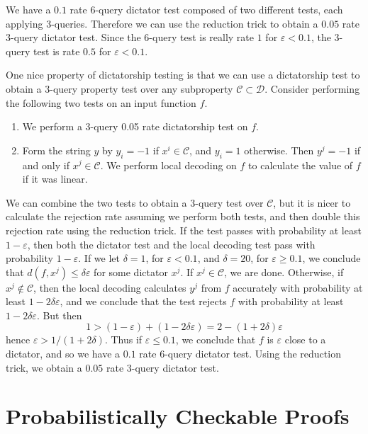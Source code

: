 \begin{example}
    We have a $0.1$ rate 6-query dictator test composed of two different tests, each applying 3-queries. Therefore we can use the reduction trick to obtain a $0.05$ rate 3-query dictator test. Since the 6-query test is really rate $1$ for $\varepsilon < 0.1$, the 3-query test is rate $0.5$ for $\varepsilon < 0.1$.
\end{example}

One nice property of dictatorship testing is that we can use a dictatorship test to obtain a 3-query property test over any subproperty $\mathcal{C} \subset \mathcal{D}$. Consider performing the following two tests on an input function $f$.
%
\begin{enumerate}
    \item We perform a 3-query 0.05 rate dictatorship test on $f$.
    \item Form the string $y$ by $y_i = -1$ if $x^i \in \mathcal{C}$, and $y_i = 1$ otherwise. Then $y^j = -1$ if and only if $x^j \in \mathcal{C}$. We perform local decoding on $f$ to calculate the value of $f$ if it was linear.
\end{enumerate}
%
We can combine the two tests to obtain a 3-query test over $\mathcal{C}$, but it is nicer to calculate the rejection rate assuming we perform both tests, and then double this rejection rate using the reduction trick. If the test passes with probability at least $1 - \varepsilon$, then both the dictator test and the local decoding test pass with probability $1 - \varepsilon$. If we let $\delta = 1$, for $\varepsilon < 0.1$, and $\delta = 20$, for $\varepsilon \geq 0.1$, we conclude that $d(f,x^j) \leq \delta \varepsilon$ for some dictator $x^j$. If $x^j \in \mathcal{C}$, we are done. Otherwise, if $x^j \not \in \mathcal{C}$, then the local decoding calculates $y^j$ from $f$ accurately with probability at least $1 - 2 \delta \varepsilon$, and we conclude that the test rejects $f$ with probability at least $1 - 2 \delta \varepsilon$. But then
%
\[ 1 > (1 - \varepsilon) + (1 - 2 \delta \varepsilon) = 2 - (1 + 2 \delta) \varepsilon \]
%
hence $\varepsilon > 1/(1 + 2 \delta)$. Thus if $\varepsilon \leq 0.1$, we conclude that $f$ is $\varepsilon$ close to a dictator, and so we have a $0.1$ rate 6-query dictator test. Using the reduction trick, we obtain a $0.05$ rate 3-query dictator test.

\section{Probabilistically Checkable Proofs}

